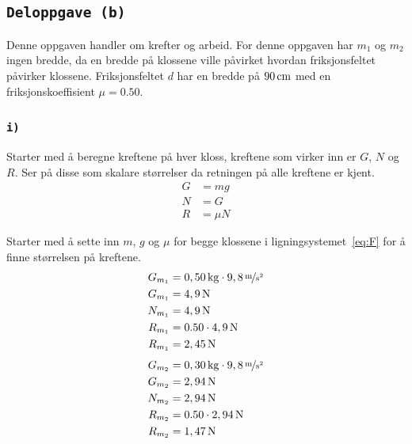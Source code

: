 \documentclass{article}
\let\oldsubsection\subsection
\renewcommand{\subsection}[1]{%
  \oldsubsection{\texttt{#1}}%
  \setcounter{subsubsection}{-1}%
}
\let\oldsubsubsection\subsubsection
\renewcommand{\subsubsection}[1]{%
  \oldsubsubsection{\texttt{#1}}%
}
\begin{document}
\clearpage
\subsection{Deloppgave (b)}
Denne oppgaven handler om krefter og arbeid. For denne oppgaven har \(m_1\) og \(m_2\) ingen bredde, da en bredde på klossene ville påvirket hvordan friksjonsfeltet påvirker klossene. Friksjonsfeltet \(d\) har en bredde på \(\unit[90]{cm}\) med en friksjonskoeﬃsient \(\mu = 0.50\).

\subsubsection{i)}
Starter med å beregne kreftene på hver kloss, kreftene som virker inn er \(G\), \(N\) og \(R\). Ser på disse som skalare størrelser da retningen på alle kreftene er kjent.
\begin{subequations}
\begin{align}
    G &= mg \\
    N &= G \\
    R &= \mu N
\end{align}
\label{eq:F}
\end{subequations}

Starter med å sette inn \(m\), \(g\) og \(\mu\) for begge klossene i ligningsystemet~\ref{eq:F} for å finne størrelsen på kreftene.
\begin{equation*}
\begin{split}
    G_{m_1} &= \unit[0,50]{kg} \cdot \unitfrac[9,8]{m}{s^2} \\
    G_{m_1} &= \unit[4,9]{N} \\
    N_{m_1} & = \unit[4,9]{N} \\
    R_{m_1} & = 0.50 \cdot \unit[4,9]{N} \\
    R_{m_1} & = \unit[2,45]{N}
\end{split}
\end{equation*}
\begin{equation*}
\begin{split}
    G_{m_2} &= \unit[0,30]{kg} \cdot \unitfrac[9,8]{m}{s^2} \\
    G_{m_2} &= \unit[2,94]{N} \\
    N_{m_2} &= \unit[2,94]{N} \\
    R_{m_2} & = 0.50 \cdot \unit[2,94]{N} \\
    R_{m_2} & = \unit[1,47]{N}
\end{split}
\end{equation*}
\end{document}
